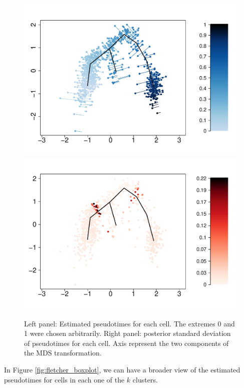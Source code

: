 
\begin{figure}[!ht]
  \centering
  \includegraphics[width=.49\linewidth]{Img/fletcher/estimated_pseudotime_new.pdf}
  \includegraphics[width=.49\linewidth]{Img/fletcher/sd_pseudotime_new.pdf}
\caption{Left panel: Estimated pseudotimes for each cell. The extremes
  0 and 1 were chosen arbitrarily. 
  Right panel: posterior standard deviation of pseudotimes for each cell. Axis represent the two components of the MDS transformation.}
\label{fig:fletcher_est_pseudo}
\end{figure}




In Figure \ref{fig:fletcher_boxplot}, we can have a broader view of
the estimated pseudotimes for cells in each one of the $k$ clusters. 

